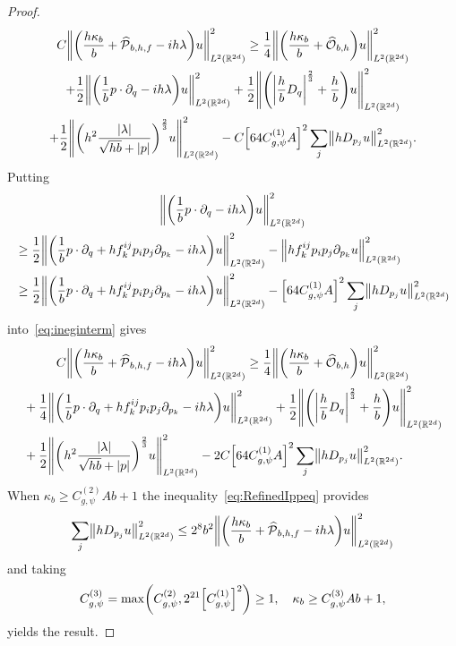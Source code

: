 \documentclass[10pt]{amsart}
\theoremstyle{definition}\newtheorem{defi}[theo]{Definition}\newtheorem{rema}[theo]{Remark}\newtheorem{exam}[theo]{Example}\newtheorem{exem}[theo]{Example}\newtheorem{nota}[theo]{Notation}
\newcommand{\R}{\mathbb{R}}
\newcommand{\clO}{\mathcal{O}}
\newcommand{\clP}{\mathcal{P}}
\let\oldhat\hat
\renewcommand*{\hat}[1]{\mathchoice{\widehat{#1}}{\widehat{#1}}{\oldhat{#1}}{\oldhat{#1}}}
\let\originalleft\left
\let\originalright\right
\renewcommand{\left}{\mathopen{}\mathclose\bgroup\originalleft}
\renewcommand{\right}{\aftergroup\egroup\originalright}
\begin{document}
\begin{proof}
\begin{multline}\label{eq:ineginterm}
C \left\| \left(\frac{ h \kappa_b}{b} + \hat{\clP}_{b,h,f} - ih\lambda \right) u \right\|_{L^2(\R^{2d})}^{2} \geq \frac{1}{4} \left\| \left(\frac{h\kappa_b}{b}+\hat{\clO}_{b,h}\right) u \right\|_{L^2(\R^{2d})}^{2}
\\+ \frac{1}{2}\left\| \left(\frac{1}{b} p\cdot\partial_q-i h\lambda \right)u \right\|_{L^2(\R^{2d})}^{2} + \frac{1}{2}\left\| \left(\left|\frac{h}{b}D_{q} \right|^{\frac{2}{3}} + \frac{h}{b}\right) u \right\|_{L^2(\R^{2d})}^{2}
\\
+ \frac{1}{2}\left\| \left(h^2 \frac{|\lambda|}{\sqrt{hb}+|p|} \right)^{\frac{2}{3}} u \right\|_{L^2(\R^{2d})}^{2} - C \left[64C_{g,\psi}^{(1)}A\right]^{2}\sum_{j} \left\| hD_{p_{j}}u \right\|_{L^2(\R^{2d})}^{2}.
\end{multline}
Putting
\begin{multline*}
\left\| \left(\frac{1}{b} p\cdot\partial_q-i h\lambda \right)u \right\|_{L^2(\R^{2d})}^{2}\\
\begin{aligned}
&\geq
\frac{1}{2}\left\| \left(\frac{1}{b} p\cdot\partial_q +hf^{ij}_{k}p_i p_j \partial_{p_k}-i h\lambda \right)u \right\|_{L^2(\R^{2d})}^{2}
-\left\| h f^{ij}_{k}p_i p_j \partial_{p_k}u \right\|_{L^2(\R^{2d})}^{2}\\
&\geq \frac{1}{2}\left\| \left(\frac{1}{b} p\cdot\partial_q +hf^{ij}_{k}p_i p_j \partial_{p_k}-i h\lambda \right)u \right\|_{L^2(\R^{2d})}^{2}
-\left[64C_{g,\psi}^{(1)}A\right]^{2}\sum_{j} \left\| hD_{p_{j}}u \right\|_{L^2(\R^{2d})}^{2}
\end{aligned}
\end{multline*}
into~\eqref{eq:ineginterm} gives
\begin{multline}\label{eq:ineginterm2}
C \left\| \left(\frac{ h \kappa_b}{b} + \hat{\clP}_{b,h,f} - ih\lambda \right) u \right\|_{L^2(\R^{2d})}^{2}
\geq \frac{1}{4} \left\| \left(\frac{h\kappa_b}{b}+\hat{\clO}_{b,h}\right) u \right\|_{L^2(\R^{2d})}^{2} \\
\begin{aligned}
&+ \frac{1}{4}\left\| \left(\frac{1}{b} p\cdot\partial_q +hf^{ij}_{k}p_i p_j \partial_{p_k}-i h\lambda \right)u \right\|_{L^2(\R^{2d})}^{2}
+ \frac{1}{2}\left\| \left(\left|\frac{h}{b}D_{q} \right|^{\frac{2}{3}}+ \frac{h}{b}\right) u \right\|_{L^2(\R^{2d})}^{2}\\
& + \frac{1}{2}\left\| \left(h^2 \frac{|\lambda|}{\sqrt{hb}+|p|} \right)^{\frac{2}{3}} u \right\|_{L^2(\R^{2d})}^{2}
- 2C\left[64C_{g,\psi}^{(1)}A\right]^{2}\sum_{j} \left\| hD_{p_{j}}u \right\|_{L^2(\R^{2d})}^{2}.
\end{aligned}
\end{multline}
When $\kappa_b\geq C_{g,\psi}^{(2)}Ab+1$ the inequality~\eqref{eq:RefinedIppeq} provides
\[
\sum_j \left\| hD_{p_{j}}u \right\|_{L^2(\R^{2d})}^{2}\leq 2^{8}b^2\left\| \left(\frac{ h \kappa_b}{b} + \hat{\clP}_{b,h,f} - ih\lambda \right) u \right\|_{L^2(\R^{2d})}^{2}
\]
and taking
\[
C_{g,\psi}^{(3)}=\max \left(C_{g,\psi}^{(2)}, 2^{21} \left[C_{g,\psi}^{(1)}\right]^2\right)\geq 1,\quad \kappa_b\geq C_{g,\psi}^{(3)}Ab+1,
\]
yields the result.
\end{proof}
\end{document}
